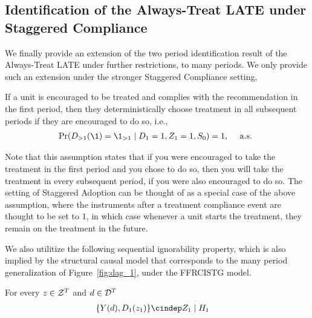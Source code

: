 \subsection{Identification of the Always-Treat LATE under Staggered Compliance}

We finally provide an extension of the two period identification result of the Always-Treat LATE under further restrictions, to many periods. We only provide such an extension under the stronger Staggered Compliance setting, 
\begin{assumption}\label{assume:staggered} If a unit is encouraged to be treated and complies with the recommendation in the first period, then they deterministically choose treatment in all subsequent periods if they are encouraged to do so, i.e.,
\begin{align}
    \Pr(D_{>1}(\1)=\1_{>1}\mid D_1=1, Z_1=1, S_0) = 1, ~~~ \text{ a.s. }
\end{align}
\end{assumption}
\noindent Note that this assumption states that if you were encouraged to take the treatment in the first period and you chose to do so, then you will take the treatment in every subsequent period, if you were also encouraged to do so. The setting of Staggered Adoption can be thought of as a special case of the above assumption, where the instruments after a treatment compliance event are thought to be set to $1$, in which case whenever a unit starts the treatment, they remain on the treatment in the future.

We also utilitize the following sequential ignorability property, which is also implied by the structural causal model that corresponds to the many period generalization of Figure~\ref{fig:dag_1}, under the FFRCISTG model.

\begin{assumption}\label{assume:3_ignorability_many}
For every $z\in {\cal Z}^T$ and $d\in {\cal D}^T$
\begin{align*}
    \{Y(d), D_{1}(z_1)\} \cindep& Z_1 \mid H_1
\end{align*}
\end{assumption}

